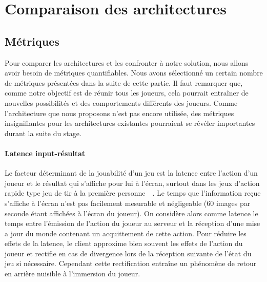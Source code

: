 \section{Comparaison des architectures}

\subsection{Métriques}

Pour comparer les architectures et les confronter à notre solution, nous allons avoir besoin de métriques quantifiables.
Nous avons sélectionné un certain nombre de métriques présentées dans la suite de cette partie.
Il faut remarquer que, comme notre objectif est de réunir tous les joueurs, cela pourrait entraîner de nouvelles possibilités et des comportements différents des joueurs.
Comme l'architecture que nous proposons n'est pas encore utilisée, des métriques insignifiantes pour les architectures existantes pourraient se révéler importantes durant la suite du stage.

\paragraph{Latence input-résultat\\}
Le facteur déterminant de la jouabilité d'un jeu est la latence entre l'action d'un joueur et le résultat qui s'affiche pour lui à l'écran, surtout dans les jeux d'action rapide type jeu de tir à la première personne~\cite{latency_can_kill}~\cite{latency_and_player_actions_in_online_games}.
Le temps que l'information reçue s'affiche à l'écran n'est pas facilement mesurable et négligeable (60 images par seconde étant affichées à l'écran du joueur).
On considère alors comme latence le temps entre l'émission de l'action du joueur au serveur et la réception d'une mise a jour du monde contenant un acquittement de cette action.
Pour réduire les effets de la latence, le client approxime bien souvent les effets de l'action du joueur et rectifie en cas de divergence lors de la réception suivante de l'état du jeu si nécessaire.
Cependant cette rectification entraîne un phénomène de retour en arrière nuisible à l'immersion du joueur.

